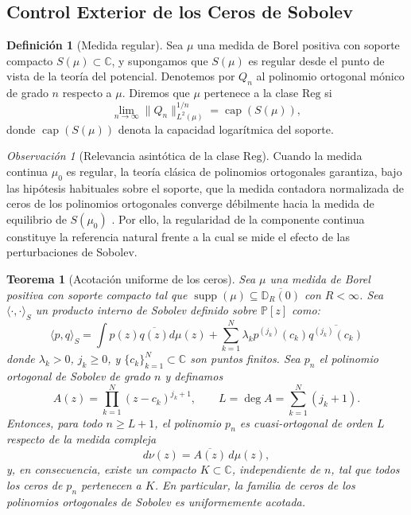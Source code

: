 \documentclass[12pt,a4paper]{article}
\newtheorem{theorem}{Teorema}
\theoremstyle{definition}
\newtheorem{definition}{Definición}
\theoremstyle{remark}
\newtheorem{remark}{Observación}
\begin{document}
\subsection{Control Exterior de los Ceros de Sobolev}

\begin{definition}[Medida regular]
	Sea $\mu$ una medida de Borel positiva con soporte compacto $S(\mu) \subset \mathbb{C}$, y supongamos que $S(\mu)$ es regular desde el punto de vista de la teoría del potencial. Denotemos por $Q_n$ al polinomio ortogonal mónico de grado $n$ respecto a $\mu$. Diremos que $\mu$ pertenece a la clase $\mathrm{Reg}$ si
	\begin{equation}
		\lim_{n \to \infty} \|Q_n\|_{L^2(\mu)}^{1/n} = \operatorname{cap}(S(\mu)),
	\end{equation}
	donde $\operatorname{cap}(S(\mu))$ denota la capacidad logarítmica del soporte.
\end{definition}

\begin{remark}[Relevancia asintótica de la clase $\mathrm{Reg}$]
	Cuando la medida continua $\mu_0$ es regular, la teoría clásica de polinomios ortogonales garantiza, bajo las hipótesis habituales sobre el soporte, que la medida contadora normalizada de ceros de los polinomios ortogonales converge débilmente hacia la medida de equilibrio de $S(\mu_0)$ \cite{stahl1992general}. Por ello, la regularidad de la componente continua constituye la referencia natural frente a la cual se mide el efecto de las perturbaciones de Sobolev.
\end{remark}

\begin{theorem}[Acotación uniforme de los ceros]\label{thm:acotacion_ceros}
	Sea $\mu$ una medida de Borel positiva con soporte compacto tal que $\operatorname{supp}(\mu) \subseteq \overline{\mathbb{D}_R(0)}$ con $R < \infty$. Sea $\langle \cdot, \cdot \rangle_S$ un producto interno de Sobolev definido sobre $\mathbb{P}[z]$ como:
	\begin{equation}\label{eq:sobolev_general}
		\langle p, q \rangle_S = \int p(z)\overline{q(z)} d\mu(z) + \sum_{k=1}^N \lambda_k p^{(j_k)}(c_k) \overline{q^{(j_k)}(c_k)}
	\end{equation}
	donde $\lambda_k > 0$, $j_k \ge 0$, y $\{c_k\}_{k=1}^N \subset \mathbb{C}$ son puntos finitos. Sea $p_n$ el polinomio ortogonal de Sobolev de grado $n$ y definamos
	\[
		A(z)=\prod_{k=1}^N (z-c_k)^{j_k+1},
		\qquad
		L = \deg A = \sum_{k=1}^N (j_k+1).
	\]
	Entonces, para todo $n \ge L+1$, el polinomio $p_n$ es cuasi-ortogonal de orden $L$ respecto de la medida compleja
	\[
		d\nu(z)=\overline{A(z)}\,d\mu(z),
	\]
	y, en consecuencia, existe un compacto $K \subset \mathbb{C}$, independiente de $n$, tal que todos los ceros de $p_n$ pertenecen a $K$. En particular, la familia de ceros de los polinomios ortogonales de Sobolev es uniformemente acotada.
\end{theorem}
\end{document}
